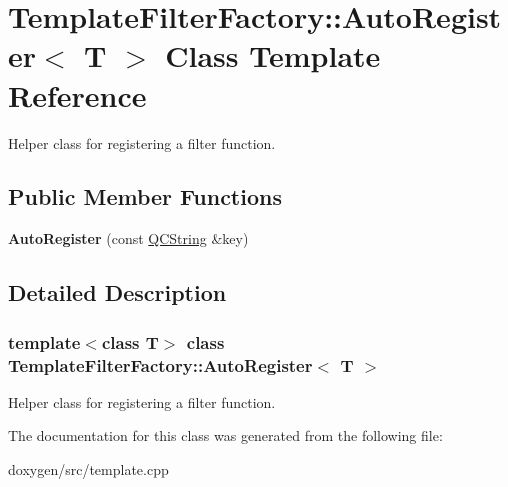 \hypertarget{class_template_filter_factory_1_1_auto_register}{}\section{Template\+Filter\+Factory\+::Auto\+Register$<$ T $>$ Class Template Reference}
\label{class_template_filter_factory_1_1_auto_register}


Helper class for registering a filter function.  


\subsection*{Public Member Functions}
\begin{DoxyCompactItemize}
\item 
\mbox{\label{class_template_filter_factory_1_1_auto_register_adae066c893e51fc4e96f2db7ab379aa6}} 
{\bfseries Auto\+Register} (const \mbox{\hyperlink{class_q_c_string}{Q\+C\+String}} \&key)
\end{DoxyCompactItemize}


\subsection{Detailed Description}
\subsubsection*{template$<$class T$>$\newline
class Template\+Filter\+Factory\+::\+Auto\+Register$<$ T $>$}

Helper class for registering a filter function. 

The documentation for this class was generated from the following file\+:\begin{DoxyCompactItemize}
\item 
doxygen/src/template.\+cpp\end{DoxyCompactItemize}
